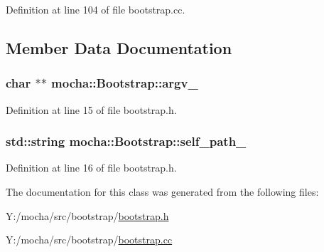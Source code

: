 Definition at line 104 of file bootstrap.cc.



\subsection{Member Data Documentation}
\hypertarget{classmocha_1_1_bootstrap_a0e051d1dc99827f5a02b3fa464de14b3}{
\subsubsection[{argv\_\-}]{\setlength{\rightskip}{0pt plus 5cm}char $\ast$$\ast$ {\bf mocha::Bootstrap::argv\_\-}}}
\label{classmocha_1_1_bootstrap_a0e051d1dc99827f5a02b3fa464de14b3}


Definition at line 15 of file bootstrap.h.

\hypertarget{classmocha_1_1_bootstrap_aef118b8931b53c8bca13e1cc5f5ba882}{
\subsubsection[{self\_\-path\_\-}]{\setlength{\rightskip}{0pt plus 5cm}std::string {\bf mocha::Bootstrap::self\_\-path\_\-}}}
\label{classmocha_1_1_bootstrap_aef118b8931b53c8bca13e1cc5f5ba882}


Definition at line 16 of file bootstrap.h.



The documentation for this class was generated from the following files:\begin{DoxyCompactItemize}
\item 
Y:/mocha/src/bootstrap/\hyperlink{bootstrap_8h}{bootstrap.h}\item 
Y:/mocha/src/bootstrap/\hyperlink{bootstrap_8cc}{bootstrap.cc}\end{DoxyCompactItemize}

